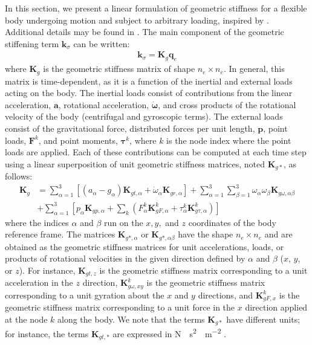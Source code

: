 \documentclass[wes, manuscript]{copernicus}
\renewcommand{\v}[1]{\boldsymbol{#1}}
\newcommand{\m}[1]{\boldsymbol{#1}}
\begin{document}
In this section, we present a linear formulation of geometric stiffness for a flexible body undergoing motion and subject to arbitrary loading, inspired by \cite{Schwertassek:book}. 
Additional details may be found in \cite{Wallrapp:1991}.
The main component of the geometric stiffening term $\v{k}_\sigma$ can be written:
\begin{align}
  \v{k}_\sigma = \m{K}_g  \v{q}_e
\end{align}
where $\m{K}_g$ is the geometric stiffness matrix of shape $n_e\times n_e$.
In general, this matrix is time-dependent, as it is a function of the inertial and external loads acting on the body.
The inertial loads consist of contributions from the linear acceleration, $\v{a}$, rotational acceleration, $\v{\dot{\omega}}$, and cross products of the rotational velocity of the body (centrifugal and gyroscopic terms).
% 
The external loads consist of the gravitational force, distributed forces per unit length, $\v{p}$, point loads, $\v{F}^k$, and point moments, $\v{\tau}^k$, where $k$ is the node index where the point loads are applied. Each of these contributions can be computed at each time step using a linear superposition of unit geometric stiffness matrices, noted $\m{K}_{g*}$, as follows:
\begin{align}
    \m{K}_g &= 
    \sum\limits_{\alpha=1}^3 \left[ 
      \left(a_\alpha - g_\alpha \right) \m{K}_{gt,\alpha}
     + \dot{\omega}_\alpha \m{K}_{gr,\alpha}
     \right]
     + \sum\limits_{\alpha=1}^3\sum\limits_{\beta=1}^3  \omega_\alpha\omega_\beta \m{K}_{g\omega,\alpha\beta} 
      \nonumber\\
      &
      + \sum\limits_{\alpha=1}^3   \left[
       p_\alpha \m{K}_{gp,\alpha}
      + \sum\limits_{k} 
         \left (  F_\alpha^k \m{K}_{gF,\alpha}^k +\tau_\alpha^k \m{K}_{g\tau,\alpha}^k\right)
       \right]
       \label{eq:GeomStiff}
\end{align}
where the indices $\alpha$ and $\beta$ run on the $x, y,$ and $z$ coordinates of the body reference frame. 
The matrices $\m{K}_{g*,\alpha}$ or $\m{K}_{g*,\alpha\beta}$ have the shape $n_e\times n_e$ and are obtained as the geometric stiffness matrices for unit accelerations, loads, or products of rotational velocities in the given direction defined by $\alpha$ and $\beta$ ($x$, $y$, or $z$).
For instance, $\m{K}_{gt,z}$ is the geometric stiffness matrix corresponding to a unit acceleration in the $z$ direction, 
$\m{K}_{g\omega,xy}^k$ is the geometric stiffness matrix corresponding to a unit gyration about the $x$ and $y$ directions, and
    $\m{K}_{gF,x}^k$ is the geometric stiffness matrix corresponding to a unit force in the $x$ direction applied at the node $k$ along the body. 
% 
We note that the terms $\m{K}_{g*}$ have different units; for instance, the terms $\m{K}_{gt,*}$ are expressed in \unit{N\cdot s^2 \cdot m^{-2}} .
\end{document}
